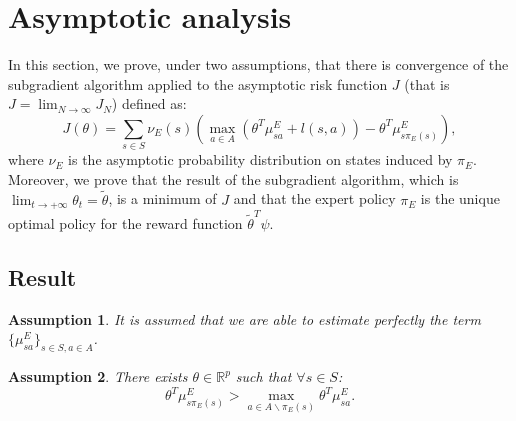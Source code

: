 \documentclass{article}
\newtheorem{assumption}{Assumption}
\begin{document}
%




\section{Asymptotic analysis}\label{proof.sec}
In this section, we prove, under two assumptions, that there is
convergence of the subgradient algorithm applied to the asymptotic
risk function $J$ (that is $J = \lim_{N\rightarrow\infty} J_N$)
defined as:
\begin{equation}
J(\theta)=\sum_{s\in S}\nu_E(s)(\max_{a \in A}(\theta^T\mu^E_{sa}+l(s,a))-\theta^T\mu^E_{s\pi_E(s)}),
\end{equation}
where $\nu_E$ is the asymptotic probability distribution on states
induced by $\pi_E$. Moreover, we prove that the result of the
subgradient algorithm, which is
$\lim_{t\rightarrow+\infty}\theta_t=\tilde{\theta}$, is a minimum of
$J$ and that the expert policy $\pi_E$ is the unique optimal policy
for the reward function $\tilde{\theta}^T\psi$.


\subsection{Result}
\begin{assumption}
\label{assumption1}
It is assumed that we are able to estimate perfectly the term $\{\mu^E_{sa}\}_{s\in S,a\in A}$.
\end{assumption}


\begin{assumption}
\label{assumption2}
There exists $\theta\in\mathbb{R}^p$ such that $\forall s\in S$:
\begin{equation}
\label{existence.eq}
\theta^T\mu^E_{s\pi_E(s)}>\max_{a \in A\backslash\pi_E(s)}\theta^T\mu^E_{sa}.
\end{equation}
\end{assumption}
\end{document}
